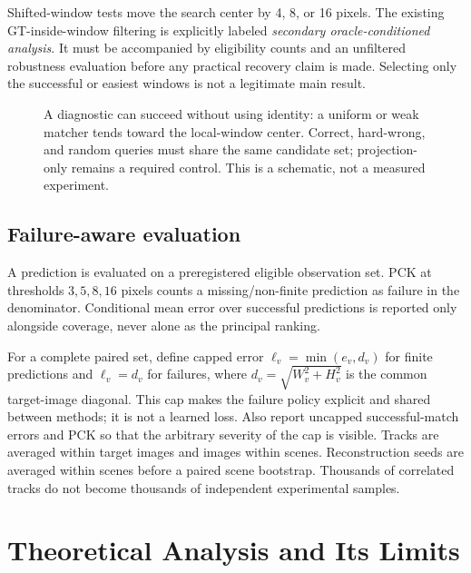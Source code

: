 \documentclass[10pt,twocolumn,letterpaper]{article}
\begin{document}
Shifted-window tests move the search center by 4, 8, or 16 pixels. The existing GT-inside-window filtering is explicitly labeled \emph{secondary oracle-conditioned analysis}. It must be accompanied by eligibility counts and an unfiltered robustness evaluation before any practical recovery claim is made. Selecting only the successful or easiest windows is not a legitimate main result.

\begin{figure}[t]
\centering
\caption{A diagnostic can succeed without using identity: a uniform or weak matcher tends toward the local-window center. Correct, hard-wrong, and random queries must share the same candidate set; projection-only remains a required control. This is a schematic, not a measured experiment.}
\label{fig:null}
\end{figure}

\subsection{Failure-aware evaluation}
A prediction is evaluated on a preregistered eligible observation set. PCK at thresholds $3,5,8,16$ pixels counts a missing/non-finite prediction as failure in the denominator. Conditional mean error over successful predictions is reported only alongside coverage, never alone as the principal ranking.

For a complete paired set, define capped error $\ell_v=\min(e_v,d_v)$ for finite predictions and $\ell_v=d_v$ for failures, where $d_v=\sqrt{W_v^2+H_v^2}$ is the common target-image diagonal. This cap makes the failure policy explicit and shared between methods; it is not a learned loss. Also report uncapped successful-match errors and PCK so that the arbitrary severity of the cap is visible. Tracks are averaged within target images and images within scenes. Reconstruction seeds are averaged within scenes before a paired scene bootstrap. Thousands of correlated tracks do not become thousands of independent experimental samples.

\section{Theoretical Analysis and Its Limits}
\end{document}
